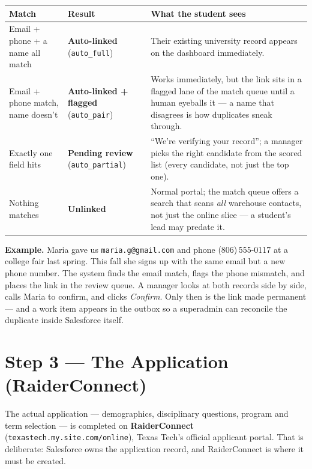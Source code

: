 \documentclass[11pt,letterpaper]{report}
\begin{document}
\begin{center}
\begin{tabularx}{\textwidth}{llX}
\toprule
\textbf{Match} & \textbf{Result} & \textbf{What the student sees} \\
\midrule
Email + phone + a name all match & \textbf{Auto-linked} (\texttt{auto\_full}) &
Their existing university record appears on the dashboard immediately. \\
Email + phone match, name doesn't & \textbf{Auto-linked + flagged}
(\texttt{auto\_pair}) & Works immediately, but the link sits in a flagged lane
of the match queue until a human eyeballs it --- a name that disagrees is how
duplicates sneak through. \\
Exactly one field hits & \textbf{Pending review} (\texttt{auto\_partial}) &
``We're verifying your record''; a manager picks the right candidate from the
scored list (every candidate, not just the top one). \\
Nothing matches & \textbf{Unlinked} & Normal portal; the match queue offers a
search that scans \emph{all} warehouse contacts, not just the online slice ---
a student's lead may predate it. \\
\bottomrule
\end{tabularx}
\end{center}

\begin{plainbox}
\textbf{Example.} Maria gave us \texttt{maria.g@gmail.com} and phone
(806)\,555-0117 at a college fair last spring. This fall she signs up with the
same email but a new phone number. The system finds the email match, flags the
phone mismatch, and places the link in the review queue. A manager looks at both
records side by side, calls Maria to confirm, and clicks \emph{Confirm}. Only
then is the link made permanent --- and a work item appears in the outbox so a
superadmin can reconcile the duplicate inside Salesforce itself.
\end{plainbox}

\section{Step 3 --- The Application (RaiderConnect)}

The actual application --- demographics, disciplinary questions, program and
term selection --- is completed on \textbf{RaiderConnect}
(\texttt{texastech.my.site.com/online}), Texas Tech's official applicant portal.
That is deliberate: Salesforce owns the application record, and RaiderConnect
is where it must be created.
\end{document}

